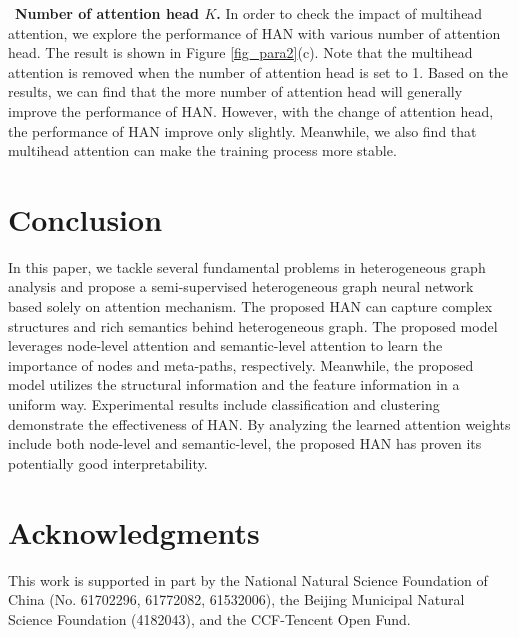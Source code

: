 \textbullet\  \textbf{Number of attention head $K$.} In order to check the impact of multihead attention, we explore the performance of HAN with various number of attention head. The result is shown in Figure \ref{fig_para2}(c). Note that the multihead attention is removed when the number of attention head is set to 1. Based on the results, we can find that the more number of attention head will generally improve the performance of HAN. However, with the change of attention head, the performance of HAN improve only slightly.
	Meanwhile, we also find that multihead attention can make the training process more stable. 
	
















\section{Conclusion}
In this paper, we tackle several fundamental problems in heterogeneous graph analysis and propose a semi-supervised heterogeneous graph neural network based solely on attention mechanism.
The proposed HAN can capture complex structures and rich semantics behind heterogeneous graph.
The proposed model leverages node-level attention and semantic-level attention to learn the importance of nodes and meta-paths, respectively. 
Meanwhile, the proposed model utilizes the structural information and the feature information in a uniform way.
Experimental results include classification and clustering 
demonstrate the effectiveness of HAN. By analyzing the learned attention weights include both node-level and semantic-level, 
the proposed HAN has proven its potentially good interpretability.



\section{Acknowledgments}
This work is supported in part by the National Natural Science Foundation of China (No. 61702296, 61772082,  61532006), the Beijing Municipal Natural Science Foundation (4182043), and the CCF-Tencent Open Fund.






